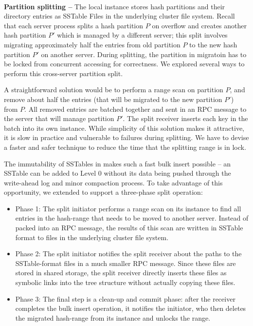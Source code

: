 ~\\
\textbf{Partition splitting -- }
The local \tfs instance stores \giga hash partitions and their directory
entries as SSTable Files in the underlying cluster file system.
Recall that each \giga server process splits a hash partition $P$ on
overflow and creates another hash partition $P'$ which is managed by a
different server; this split involves migrating approximately half the entries
from old partition $P$ to the new hash partition $P'$ on another server.
During splitting, the partition in migratoin has to be locked from
concurrent accessing for correctness.
We explored several ways to perform this cross-server partition split.

A straightforward solution would be to perform a range scan on
partition $P$, and remove about half the entries
(that will be migrated to the new partition $P'$) from $P$.
All removed entries are batched together
and sent in an RPC message to the server that will manage partition $P'$.
The split receiver inserts each key in the batch into its own \tfs instance.
While simplicity of this solution makes it attractive,
it is slow in practice and vulnerable to failures during splitting.
We have to devise a faster and safer technique to
reduce the time that the splitting range is in lock.

The immutability of SSTables in \ldb makes such a fast bulk insert possible --
an SSTable can be added to Level 0 without its data being pushed through the
write-ahead log and minor compaction process.
To take advantage of this opportunity, we extended \tfs
to support a three-phase split operation:

\begin{itemize}
\item{Phase 1:} The split initiator performs a range scan on its \tfs instance
to find all entries in the hash-range that needs to be moved to another server.
Instead of packed into an RPC message,
the results of this scan are written in SSTable format to files in the
underlying cluster file system.

\item{Phase 2:} The split initiator notifies the split receiver about
the paths to the SSTable-format files in a much smaller RPC message.
Since these files are stored in shared storage,
the split receiver directly inserts these files as symbolic links
into the \ldb tree structure without actually copying these files.

\item{Phase 3:} The final step is a clean-up and commit phase:
after the receiver completes the bulk insert operation, it notifies the
initiator, who then deletes the migrated hash-range from its \tfs instance
and unlocks the range.
\end{itemize}

